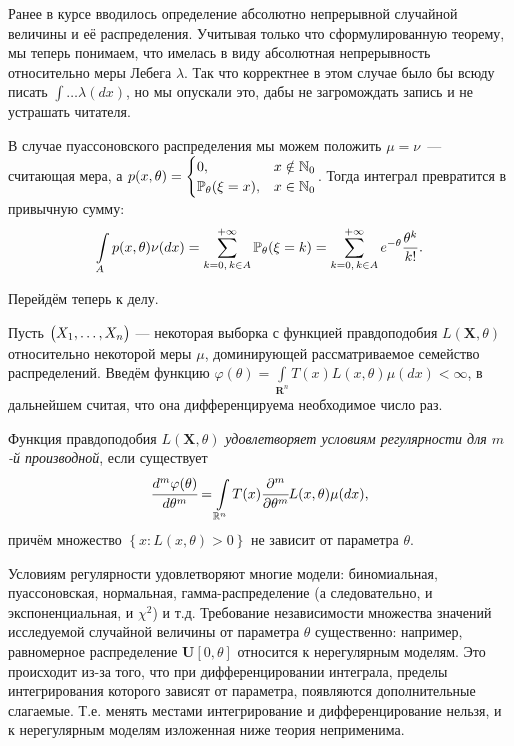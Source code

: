 \begin{rmrk}
    Ранее в курсе вводилось определение абсолютно непрерывной случайной величины и её распределения.
    Учитывая только что сформулированную теорему, мы теперь понимаем, что имелась в виду абсолютная непрерывность относительно меры Лебега $\lambda$.
    Так что корректнее в этом случае было бы всюду писать $\int \ldots \lambda(dx)$, но мы опускали это, дабы не загромождать запись и не устрашать читателя.
\end{rmrk}

\begin{exmp}
    В случае пуассоновского распределения мы можем положить $\mu = \nu$~--- считающая мера, а $p(x, \theta) = \begin{cases}
        0, & x \notin \mathbb{N}_0 \\
        \mathbb{P}_{\theta}(\xi = x), & x \in \mathbb{N}_0
    \end{cases}$.
    Тогда интеграл превратится в привычную сумму:
    \begin{equation*}
        \int\limits_A p(x, \theta) \nu(dx) = 
        \sum\limits_{k = 0, \, k \in A}^{+\infty} \mathbb{P}_{\theta} (\xi = k) = 
        \sum\limits_{k = 0, \, k \in A}^{+\infty} e^{-\theta} \frac{\theta^k}{k!}.
    \end{equation*}
\end{exmp}
Перейдём теперь к делу.

\vspace{5mm}
Пусть $\bigl( X_1, \ldots, X_n \bigr)$  —  некоторая выборка с функцией правдоподобия $L(\mathbf{X}, \theta)$ относительно некоторой меры $\mu$, доминирующей рассматриваемое семейство распределений. 
Введём функцию ${\varphi(\theta)=\int\limits_{\mathbf{R}^{n}} T(x) L(x, \theta) \mu(d x)<\infty}$, в дальнейшем считая, что она дифференцируема необходимое число раз.

\begin{defn}
    Функция правдоподобия $L(\mathbf{X}, \theta)$ \textit{удовлетворяет условиям регулярности для $m$-й производной}, если существует
    \begin{equation*}
        \cfrac{d^{m} \varphi(\theta)}{d \theta^{m}}=\int\limits_{\mathbb{R}^{n}} T(x) \cfrac{\partial^{m}}{\partial \theta^{m}}L(x, \theta) \mu(d x),
    \end{equation*}
    причём множество $\left\{ {x\colon L(x,\theta) > 0} \right\}$ не зависит от параметра $\theta$.
\end{defn}

\begin{exmp}
    Условиям регулярности удовлетворяют многие модели: биномиальная, пуассоновская, нормальная, гамма-распределение (а следовательно, и экспоненциальная, и $\chi^2$) и т.д.
    Требование независимости множества значений исследуемой случайной величины от параметра $\theta$ существенно: например, равномерное распределение $\mathbf{U}[0, \theta]$ относится к нерегулярным моделям.
    Это происходит из-за того, что при дифференцировании интеграла, пределы интегрирования которого зависят от параметра, появляются дополнительные слагаемые. 
    Т.е. менять местами интегрирование и дифференцирование нельзя, и к нерегулярным моделям изложенная ниже теория неприменима.
\end{exmp}

